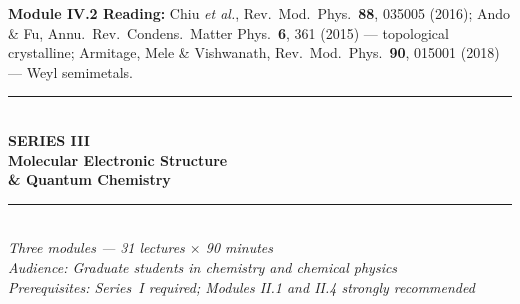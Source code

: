 \documentclass[11pt,a4paper]{article}
\begin{document}
\begin{tcolorbox}[highlightbox]
\textbf{Module IV.2 Reading:} Chiu \textit{et al.}, Rev.\ Mod.\ Phys.\ \textbf{88}, 035005 (2016); Ando \& Fu, Annu.\ Rev.\ Condens.\ Matter Phys.\ \textbf{6}, 361 (2015) --- topological crystalline; Armitage, Mele \& Vishwanath, Rev.\ Mod.\ Phys.\ \textbf{90}, 015001 (2018) --- Weyl semimetals.
\end{tcolorbox}

\newpage
\thispagestyle{empty}
\pagecolor{darkblue}
\color{white}
\vspace*{2.2cm}
\begin{center}
  {\color{accentgold}\rule{11cm}{1.5pt}}\\[0.5cm]
  {\fontsize{11}{14}\selectfont\bfseries\color{accentgold}\MakeUppercase{Series III}}\\[0.3cm]
  {\fontsize{22}{28}\selectfont\bfseries Molecular Electronic Structure}\\[0.2cm]
  {\fontsize{22}{28}\selectfont\bfseries \& Quantum Chemistry}\\[0.4cm]
  {\color{accentgold}\rule{11cm}{1.5pt}}\\[1.0cm]
  {\large\itshape Three modules --- 31 lectures $\times$ 90 minutes}\\[0.5cm]
  {\normalsize\itshape Audience: Graduate students in chemistry and chemical physics}\\[0.3cm]
  {\normalsize\itshape Prerequisites: Series~I required; Modules II.1 and II.4 strongly recommended}\\[1.6cm]


\end{center}
\end{document}
